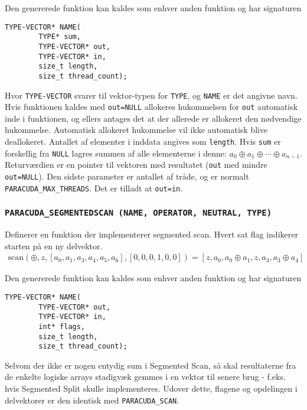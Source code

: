 Den genererede funktion kan kaldes som enhver anden funktion og har signaturen

\begin{verbatim}
TYPE-VECTOR* NAME(
        TYPE* sum, 
        TYPE-VECTOR* out, 
        TYPE-VECTOR* in, 
        size_t length, 
        size_t thread_count);
\end{verbatim}

Hvor \verb|TYPE-VECTOR| svarer til vektor-typen for \verb|TYPE|, og \verb|NAME| er det angivne navn. 
Hvis funktionen kaldes med \verb|out=NULL| allokeres hukommelsen 
for \verb|out| automatisk inde i funktionen, og ellers antages det at der allerede er 
allokeret den nødvendige hukommelse. Automatisk allokeret hukommelse vil ikke automatisk
blive deallokeret. Antallet af elementer i inddata angives som \verb|length|. 
Hvis \verb|sum| er forskellig fra \verb|NULL| lagres summen af alle elementerne i denne:
$a_0 \oplus a_1 \oplus \cdots \oplus a_{n-1}$.
Returværdien er en pointer til vektoren med resultatet (\verb|out| med mindre \verb|out=NULL|).
Den sidste parameter er antallet af tråde, og er normalt \verb|PARACUDA_MAX_THREADS|.
Det er tilladt at \verb|out=in|.

\subsubsection*{\texttt{PARACUDA\_SEGMENTEDSCAN \scriptsize(NAME, OPERATOR, NEUTRAL, TYPE)}}
Definerer en funktion der implementerer segmented scan. Hvert sat flag indikerer starten
på en ny delvektor.
\[
\begin{array}{l}
\mbox{scan}(\oplus, z, [a_0, a_1, a_3, a_4, a_5, a_6], [0, 0, 0, 1, 0, 0]) =
[z, a_0, a_0 \oplus a_1, z, a_3, a_3 \oplus a_4]
\end{array}
\]

Den genererede funktion kan kaldes som enhver anden funktion og har signaturen

\begin{verbatim}
TYPE-VECTOR* NAME(
        TYPE-VECTOR* out, 
        TYPE-VECTOR* in, 
        int* flags, 
        size_t length, 
        size_t thread_count);
\end{verbatim}

Selvom der ikke er nogen entydig sum  i Segmented Scan, så skal resultaterne fra de enkelte logiske arrays stadigvæk gemmes i en vektor til senere brug - f.eks. hvis Segmented Split skulle implementeres. Udover dette, flagene og 
opdelingen i delvektorer er den identisk med \verb|PARACUDA_SCAN|.

